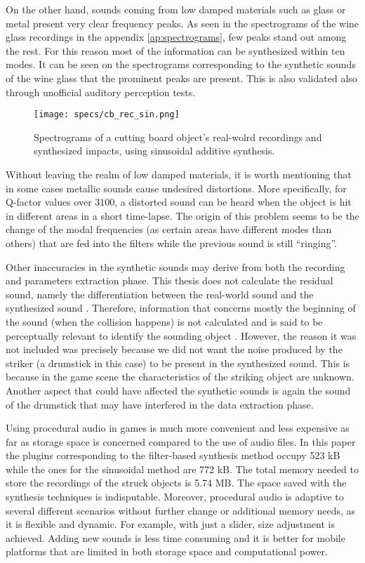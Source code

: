 On the other hand, sounds coming from low damped materials such as glass or metal present very clear frequency peaks. As seen in the spectrograms of the wine glass recordings in the appendix \ref{ap:spectrograms}, few peaks stand out among the rest. For this reason most of the information can be synthesized within ten modes. It can be seen on the spectrograms corresponding to the synthetic sounds of the wine glass that the prominent peaks are present. This is also validated also through unofficial auditory perception tests. 


\begin{figure}[H]
  \centering
    \texttt{[image: specs/cb\_rec\_sin.png]}
      \caption{Spectrograms of a cutting board object's real-wolrd recordings and synthesized impacts, using sinusoidal additive synthesis.}
      \label{fig:specs_cb}
\end{figure}

Without leaving the realm of low damped materials, it is worth mentioning that in some cases metallic sounds cause undesired distortions. More specifically, for Q-factor values over $3100$, a distorted sound can be heard when the object is hit in different areas  in a short time-lapse. The origin of this problem seems to be the change of the modal frequencies (as certain areas have different modes than others) that are fed into the filters while the previous sound is still ``ringing''. 


Other inaccuracies in the synthetic sounds may derive from both the recording and parameters extraction phase. This thesis does not calculate the residual sound, namely the differentiation between the real-world sound and the synthesized sound \cite{ren2013example}. Therefore, information that concerns mostly the beginning of the sound (when the collision happens) is not calculated and is said to be perceptually relevant to identify the sounding object \cite{freed1990auditory}. However, the reason it was not included was precisely because we did not want the noise produced by the striker (a drumstick in this case) to be present in the synthesized sound. This is because in the game scene the characteristics of the striking object are unknown. Another aspect that could have affected the synthetic sounds is again the sound of the drumstick that may have interfered in the data extraction phase.

Using procedural audio in games is much more convenient and less expensive as far as storage space is concerned compared to the use of audio files. In this paper the plugins corresponding to the filter-based synthesis method occupy 523 kB while the ones for the sinusoidal method are 772 kB. The total memory needed to store the recordings of the struck objects is 5.74 MB. The space saved with the synthesis techniques is indisputable. Moreover, procedural audio is adaptive to several different scenarios without further change or additional memory needs, as it is flexible and dynamic. For example, with just a slider, size adjustment is achieved.  Adding new sounds is less time consuming and it is better for mobile platforms that are limited in both storage space and computational power.

